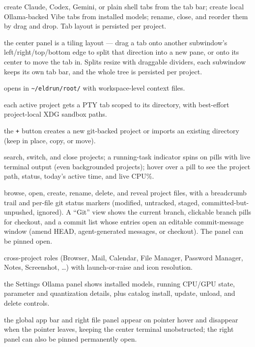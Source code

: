 \documentclass[11pt,a4paper]{article}
\newcommand{\code}[1]{\texttt{#1}}
\begin{document}
\begin{description}[leftmargin=1.2em,style=nextline]
  \item[Agent-terminal orchestration] create Claude, Codex, Gemini, or plain
  shell tabs from the tab bar; create local Ollama-backed Vibe tabs from
  installed models; rename, close, and reorder them by drag and drop. Tab layout
  is persisted per project.
  \item[Tiling subwindows] the center panel is a tiling layout --- drag a tab
  onto another subwindow's left/right/top/bottom edge to split that direction
  into a new pane, or onto its center to move the tab in. Splits resize with
  draggable dividers, each subwindow keeps its own tab bar, and the whole tree
  is persisted per project.
  \item[Root control terminal] opens in \code{\textasciitilde/eldrun/root/} with
  workspace-level context files.
  \item[Project terminals] each active project gets a PTY tab scoped to its
  directory, with best-effort project-local XDG sandbox paths.
  \item[Project creation and import] the \code{+} button creates a new
  git-backed project or imports an existing directory (keep in place, copy, or
  move).
  \item[Project switcher] search, switch, and close projects; a running-task
  indicator spins on pills with live terminal output (even backgrounded
  projects); hover over a pill to see the project path, status, today's active
  time, and live CPU\%.
  \item[Right file panel] browse, open, create, rename, delete, and reveal
  project files, with a breadcrumb trail and per-file git status markers
  (modified, untracked, staged, committed-but-unpushed, ignored). A ``Git'' view
  shows the current branch, clickable branch pills for checkout, and a commit
  list whose entries open an editable commit-message window (amend HEAD,
  agent-generated messages, or checkout). The panel can be pinned open.
  \item[Global app toolbar] cross-project roles (Browser, Mail, Calendar, File
  Manager, Password Manager, Notes, Screenshot, \dots) with launch-or-raise and
  icon resolution.
  \item[Ollama model management] the Settings Ollama panel shows installed
  models, running CPU/GPU state, parameter and quantization details, plus
  catalog install, update, unload, and delete controls.
  \item[Hover-revealed panels] the global app bar and right file panel appear on
  pointer hover and disappear when the pointer leaves, keeping the center
  terminal unobstructed; the right panel can also be pinned permanently open.
\end{description}
\end{document}

